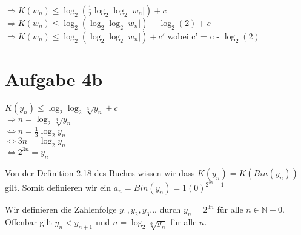 \documentclass{article}
\begin{document}
    \par
	
	$\Rightarrow K(w_{n}) \le \log_{2}(\frac{1}{2} \log_{2} \log_{2} |w_{n}|) + c$ \\
	$\Rightarrow K(w_{n}) \le \log_{2}(\log_{2} \log_{2} |w_{n}|) - \log_{2}(2) + c$ \\
	$\Rightarrow K(w_{n}) \le \log_{2}(\log_{2} \log_{2} |w_{n}|) + c'$ wobei c' = c - $\log_{2}(2)$
	
	\section*{Aufgabe 4b}
	\begin{center}
	$K(y_{n}) \le \log_{2} \log_{2} \sqrt[3]{y_{n}} + c$ \\
	$\Rightarrow n =  \log_{2} \sqrt[3]{y_{n}}$ \\
	$\Leftrightarrow n = \frac{1}{3} \log_{2} y_{n} $ \\
	$\Leftrightarrow 3n = \log_{2} y_{n} $ \\
	$\Leftrightarrow 2^{3n} = y_{n} $
	\end{center}
	
	
	 
	\par 
	\noindent
	Von der Definition 2.18 des Buches wissen wir dass $K(y_{n}) = K(Bin(y_{n}))$ gilt. Somit definieren wir ein $a_{n} = Bin(y_{n}) = 1(0)^{2^{3n} - 1}$
    
    \par 
    \noindent
    Wir definieren die Zahlenfolge $y_{1}, y_{2}, y_{3}...$ durch $y_{n} = 2^{3n}$ für alle $ n \in \mathbb{N} - {0}$.
    Offenbar gilt $y_{n} < y_{n+1}$ und $n = \log_{2} \sqrt[3]{y_{n}}$ für alle $n$.
    
   
\end{document}
